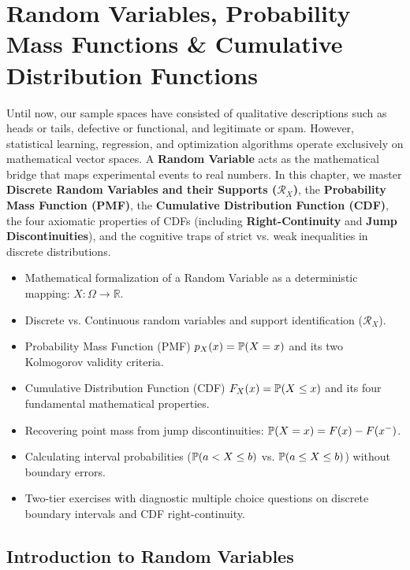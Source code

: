 \chapter{Random Variables, Probability Mass Functions \& Cumulative Distribution Functions}

Until now, our sample spaces have consisted of qualitative descriptions such as heads or tails, defective or functional, and legitimate or spam. However, statistical learning, regression, and optimization algorithms operate exclusively on mathematical vector spaces. A \textbf{Random Variable} acts as the mathematical bridge that maps experimental events to real numbers. In this chapter, we master \textbf{Discrete Random Variables and their Supports ($\mathcal{R}_X$)}, the \textbf{Probability Mass Function (PMF)}, the \textbf{Cumulative Distribution Function (CDF)}, the four axiomatic properties of CDFs (including \textbf{Right-Continuity} and \textbf{Jump Discontinuities}), and the cognitive traps of strict vs. weak inequalities in discrete distributions.

\vspace{0.5cm}
\begin{tcolorbox}[colback=primarylight, colframe=primarydark, title={\textbf{What You'll Learn in this Chapter}}]
\begin{itemize}
    \item Mathematical formalization of a Random Variable as a deterministic mapping: $X \colon \Omega \to \mathbb{R}$.
    \item Discrete vs. Continuous random variables and support identification ($\mathcal{R}_X$).
    \item Probability Mass Function (PMF) $p_X(x) = \P(X = x)$ and its two Kolmogorov validity criteria.
    \item Cumulative Distribution Function (CDF) $F_X(x) = \P(X \le x)$ and its four fundamental mathematical properties.
    \item Recovering point mass from jump discontinuities: $\P(X = x) = F(x) - F(x^-)$.
    \item Calculating interval probabilities ($\P(a < X \le b)$ vs. $\P(a \le X \le b)$) without boundary errors.
    \item Two-tier exercises with diagnostic multiple choice questions on discrete boundary intervals and CDF right-continuity.
\end{itemize}
\end{tcolorbox}

\section{Introduction to Random Variables}

